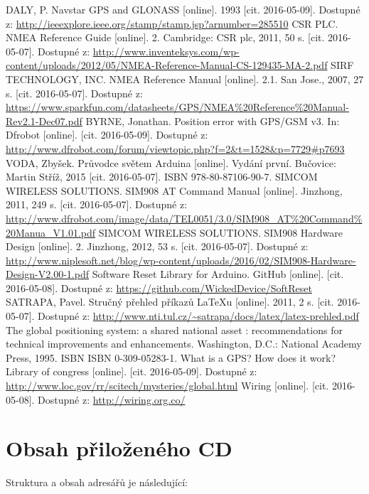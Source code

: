 \documentclass[FM,BP]{tulthesis}  %
\begin{document}
\begin{thebibliography}{10}
DALY, P. Navstar GPS and GLONASS [online]. 1993 [cit. 2016-05-09]. Dostupné z: \url{http://ieeexplore.ieee.org/stamp/stamp.jsp?arnumber=285510}
CSR PLC. NMEA Reference Guide [online]. 2. Cambridge: CSR plc, 2011, 50 s. [cit. 2016-05-07]. Dostupné z: \url{http://www.inventeksys.com/wp-content/uploads/2012/05/NMEA-Reference-Manual-CS-129435-MA-2.pdf}
SIRF TECHNOLOGY, INC. NMEA Reference Manual [online]. 2.1. San Jose., 2007, 27 s. [cit. 2016-05-07]. Dostupné z: \url{https://www.sparkfun.com/datasheets/GPS/NMEA\%20Reference\%20Manual-Rev2.1-Dec07.pdf}
BYRNE, Jonathan. Position error with GPS/GSM v3. In: Dfrobot [online]. [cit. 2016-05-09]. Dostupné z: \url{http://www.dfrobot.com/forum/viewtopic.php?f=2\&t=1528\&p=7729\#p7693}
VODA, Zbyšek. Průvodce světem Arduina [online]. Vydání první. Bučovice: Martin Stříž, 2015 [cit. 2016-05-07]. ISBN 978-80-87106-90-7.
SIMCOM WIRELESS SOLUTIONS. SIM908 AT Command Manual [online]. Jinzhong, 2011, 249 s. [cit. 2016-05-07]. Dostupné z: \url{http://www.dfrobot.com/image/data/TEL0051/3.0/SIM908\_AT\%20Command\%20Manua\_V1.01.pdf}
SIMCOM WIRELESS SOLUTIONS. SIM908 Hardware Design [online]. 2. Jinzhong, 2012, 53 s. [cit. 2016-05-07]. Dostupné z: \url{http://www.niplesoft.net/blog/wp-content/uploads/2016/02/SIM908-Hardware-Design-V2.00-1.pdf}
Software Reset Library for Arduino. GitHub [online]. [cit. 2016-05-08]. Dostupné z: \url{https://github.com/WickedDevice/SoftReset}
SATRAPA, Pavel. Stručný přehled příkazů LaTeXu [online]. 2011, 2 s. [cit. 2016-05-07]. Dostupné z: \url{http://www.nti.tul.cz/~satrapa/docs/latex/latex-prehled.pdf}
The global positioning system: a shared national asset : recommendations for technical improvements and enhancements. Washington, D.C.: National Academy Press, 1995. ISBN ISBN 0-309-05283-1.
What is a GPS? How does it work? Library of congress [online]. [cit. 2016-05-09]. Dostupné z: \url{http://www.loc.gov/rr/scitech/mysteries/global.html}
Wiring [online]. [cit. 2016-05-08]. Dostupné z: \url{http://wiring.org.co/}
\end{thebibliography}


\appendix
\chapter{Obsah přiloženého CD}
Struktura a obsah adresářů je následující:
\end{document}
